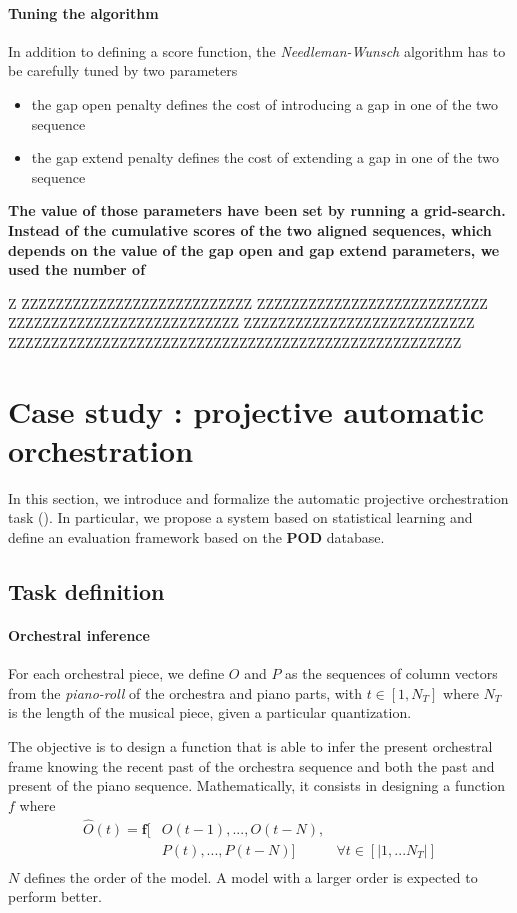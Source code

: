 \documentclass[twoside,twocolumn]{article}
\begin{document}
\paragraph{Tuning the algorithm}
In addition to defining a score function, the \textit{Needleman-Wunsch} algorithm has to be carefully tuned by two parameters
\begin{itemize}
\item the gap open penalty defines the cost of introducing a gap in one of the two sequence
\item the gap extend penalty defines the cost of extending a gap in one of the two sequence
\end{itemize}
\textbf{The value of those parameters have been set by running a grid-search. Instead of the cumulative scores of the two aligned sequences, which depends on the value of the gap open and gap extend parameters, we used the number of}

Z
ZZZZZZZZZZZZZZZZZZZZZZZZZZZ
ZZZZZZZZZZZZZZZZZZZZZZZZZZZ
ZZZZZZZZZZZZZZZZZZZZZZZZZZZ
ZZZZZZZZZZZZZZZZZZZZZZZZZZZ
ZZZZZZZZZZZZZZZZZZZZZZZZZZZZZZZZZZZZZZZZZZZZZZZZZZZZZ
\section{Case study : projective automatic orchestration}

In this section, we introduce and formalize the automatic projective orchestration task (). In particular, we propose a system based on statistical learning and define an evaluation framework based on the \textbf{POD} database.

\subsection{Task definition}
\paragraph{Orchestral inference}
For each orchestral piece, we define $O$ and $P$ as the sequences of column vectors from the \textit{piano-roll} of the orchestra and piano parts, with $t \in \left[ 1,N_{T} \right]$ where $N_{T}$ is the length of the musical piece, given a particular quantization.

The objective is to design a function that is able to infer the present orchestral frame knowing the recent past of the orchestra sequence and both the past and present of the piano sequence. Mathematically, it consists in designing a function $f$ where
\begin{equation}
\begin{aligned}
\hat{O}(t) = \bm{f}\lbrack & O(t-1), ..., O(t-N), & \\
	& P(t), ... ,P(t-N) \rbrack & \forall t \in \left\lbrack|1, ... N_{T}|\right\rbrack\\
\end{aligned}
\label{eq:inference_function}
\end{equation}
$N$ defines the order of the model. A model with a larger order is expected to perform better.
\end{document}
